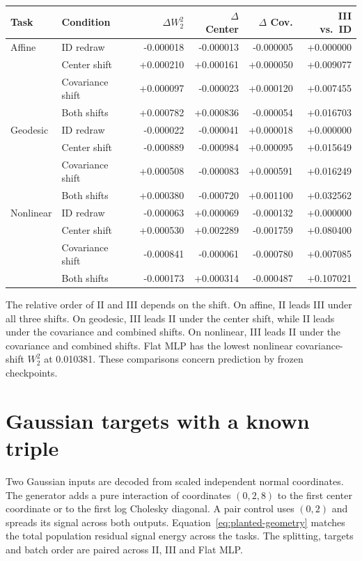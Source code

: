 \documentclass[11pt]{article}
\numberwithin{equation}{section}
\begin{document}
\begin{center}
\small
\begin{tabularx}{\linewidth}{@{} Y l r r r r @{}}
\toprule
\textbf{Task} & \textbf{Condition} & \textbf{\(\Delta W_2^2\)} & \textbf{\(\Delta\) Center} & \textbf{\(\Delta\) Cov.} & \textbf{III vs.\ ID} \\
\midrule
Affine & ID redraw & -0.000018 & -0.000013 & -0.000005 & +0.000000 \\
 & Center shift & +0.000210 & +0.000161 & +0.000050 & +0.009077 \\
 & Covariance shift & +0.000097 & -0.000023 & +0.000120 & +0.007455 \\
 & Both shifts & +0.000782 & +0.000836 & -0.000054 & +0.016703 \\
Geodesic & ID redraw & -0.000022 & -0.000041 & +0.000018 & +0.000000 \\
 & Center shift & -0.000889 & -0.000984 & +0.000095 & +0.015649 \\
 & Covariance shift & +0.000508 & -0.000083 & +0.000591 & +0.016249 \\
 & Both shifts & +0.000380 & -0.000720 & +0.001100 & +0.032562 \\
Nonlinear & ID redraw & -0.000063 & +0.000069 & -0.000132 & +0.000000 \\
 & Center shift & +0.000530 & +0.002289 & -0.001759 & +0.080400 \\
 & Covariance shift & -0.000841 & -0.000061 & -0.000780 & +0.007085 \\
 & Both shifts & -0.000173 & +0.000314 & -0.000487 & +0.107021 \\
\bottomrule
\end{tabularx}
\end{center}

The relative order of II and III depends on the shift. On affine, II
leads III under all three shifts. On geodesic, III leads II under the
center shift, while II leads under the covariance and combined shifts.
On nonlinear, III leads II under the covariance and combined shifts.
Flat MLP has the lowest nonlinear covariance-shift \(W_2^2\) at 0.010381.
These comparisons concern prediction by frozen checkpoints.

\section{Gaussian targets with a known triple}
\label{sec:planted-geometry}

Two Gaussian inputs are decoded from scaled independent normal
coordinates. The generator adds a pure interaction of coordinates
\((0,2,8)\) to the first center coordinate or to the first log Cholesky
diagonal. A pair control uses \((0,2)\) and spreads its signal across
both outputs. Equation~\eqref{eq:planted-geometry} matches the total
population residual signal energy across the tasks. The splitting,
targets and batch order are paired across II, III and Flat MLP.
\end{document}
